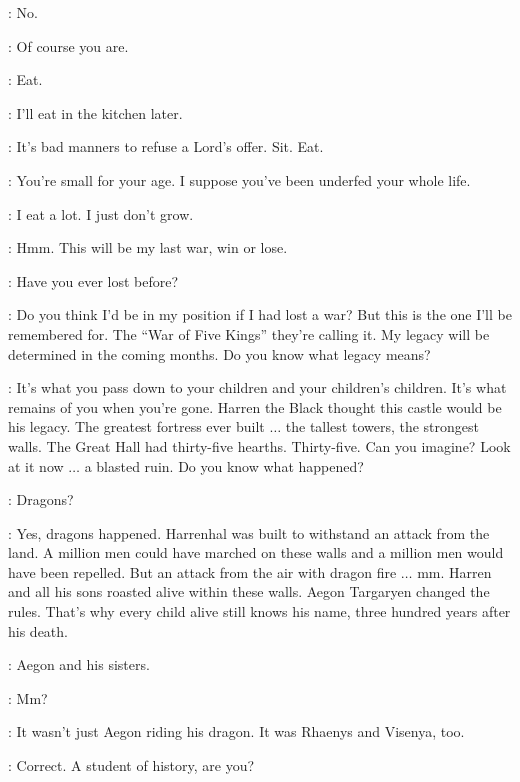 \ARYA: No.

\TYWIN: Of course you are.

\ARYA: Eat.

\TYWIN: I'll eat in the kitchen later.

\ARYA: It's bad manners to refuse a Lord's offer. Sit. Eat.


\TYWIN: You're small for your age. I suppose you've been underfed your whole life.

\ARYA: I eat a lot. I just don't grow.

\TYWIN: Hmm. This will be my last war, win or lose.


\ARYA: Have you ever lost before?

\TYWIN: Do you think I'd be in my position if I had lost a war? But this is the one I'll be remembered for. The ``War of Five Kings'' they're calling it. My legacy will be determined in the coming months. Do you know what legacy means?


\TYWIN: It's what you pass down to your children and your children's children. It's what remains of you when you're gone. Harren the Black thought this castle would be his legacy. The greatest fortress ever built $\ldots$ the tallest towers, the strongest walls. The Great Hall had thirty-five hearths. Thirty-five. Can you imagine? Look at it now $\ldots$ a blasted ruin. Do you know what happened?

\ARYA: Dragons?

\TYWIN: Yes, dragons happened. Harrenhal was built to withstand an attack from the land. A million men could have marched on these walls and a million men would have been repelled. But an attack from the air with dragon fire $\ldots$ mm. Harren and all his sons roasted alive within these walls. Aegon Targaryen changed the rules. That's why every child alive still knows his name, three hundred years after his death.

\ARYA: Aegon and his sisters.

\TYWIN: Mm?

\ARYA: It wasn't just Aegon riding his dragon. It was Rhaenys and Visenya, too.

\TYWIN: Correct. A student of history, are you?

